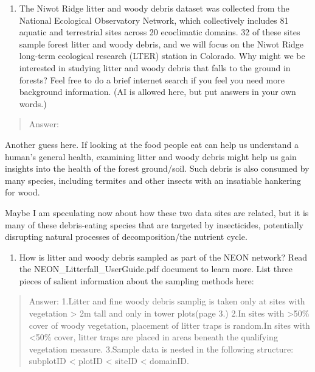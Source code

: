 \documentclass[
]{article}
\providecommand{\tightlist}{%
  \setlength{\itemsep}{0pt}\setlength{\parskip}{0pt}}
\begin{document}
\begin{enumerate}
\def\labelenumi{\arabic{enumi}.}
\setcounter{enumi}{2}
\tightlist
\item
  The Niwot Ridge litter and woody debris dataset was collected from the
  National Ecological Observatory Network, which collectively includes
  81 aquatic and terrestrial sites across 20 ecoclimatic domains. 32 of
  these sites sample forest litter and woody debris, and we will focus
  on the Niwot Ridge long-term ecological research (LTER) station in
  Colorado. Why might we be interested in studying litter and woody
  debris that falls to the ground in forests? Feel free to do a brief
  internet search if you feel you need more background information. (AI
  is allowed here, but put answers in your own words.)
\end{enumerate}

\begin{quote}
Answer:
\end{quote}

Another guess here. If looking at the food people eat can help us
understand a human's general health, examining litter and woody debris
might help us gain insights into the health of the forest ground/soil.
Such debris is also consumed by many species, including termites and
other insects with an insatiable hankering for wood.

Maybe I am speculating now about how these two data sites are related,
but it is many of these debris-eating species that are targeted by
insecticides, potentially disrupting natural processes of
decomposition/the nutrient cycle.

\begin{enumerate}
\def\labelenumi{\arabic{enumi}.}
\setcounter{enumi}{3}
\tightlist
\item
  How is litter and woody debris sampled as part of the NEON network?
  Read the NEON\_Litterfall\_UserGuide.pdf document to learn more. List
  three pieces of salient information about the sampling methods here:
\end{enumerate}

\begin{quote}
Answer: 1.Litter and fine woody debris samplig is taken only at sites
with vegetation \textgreater{} 2m tall and only in tower plots(page 3.)
2.In sites with \textgreater50\% cover of woody vegetation, placement of
litter traps is random.In sites with \textless50\% cover, litter traps
are placed in areas beneath the qualifying vegetation measure. 3.Sample
data is nested in the following structure: subplotID \textless{} plotID
\textless{} siteID \textless{} domainID.
\end{quote}
\end{document}
